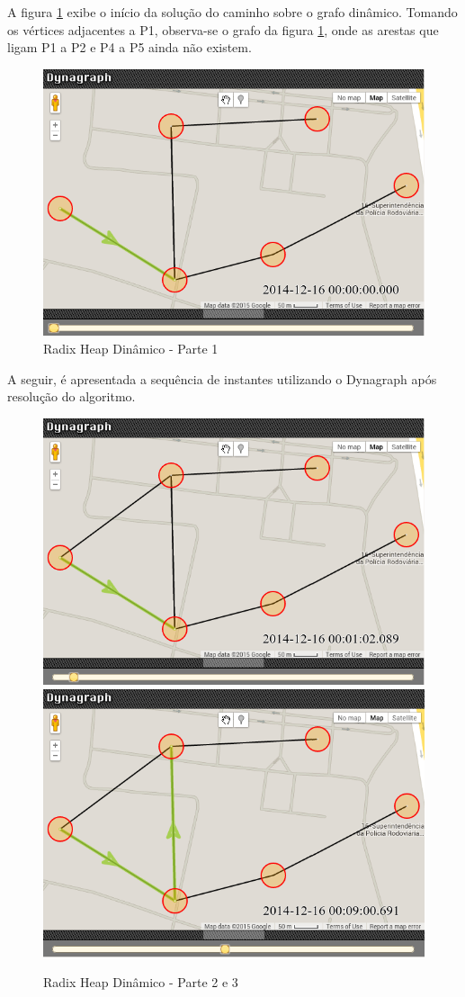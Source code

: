 A figura \ref{fig:dyndyn1} exibe o início da solução do caminho sobre o grafo dinâmico.
Tomando os vértices adjacentes a P1, observa-se o grafo da figura \ref{fig:dyndyn1}, onde as arestas
que ligam P1 a P2 e P4 a P5 ainda não existem.

\begin{figure}[htbp]
\centering
 \includegraphics[width=.55\textwidth]{chapters/fig/dyndyn1.png}
\caption{Radix Heap Dinâmico - Parte 1}
\label{fig:dyndyn1}
\end{figure}
\FloatBarrier

A seguir, é apresentada a sequência de instantes utilizando o Dynagraph após resolução do algoritmo.

\begin{figure}[htbp]
\centering
 \includegraphics[width=.45\textwidth]{chapters/fig/dyndyn2.png}
 \includegraphics[width=.45\textwidth]{chapters/fig/dyndyn3.png}
\caption{Radix Heap Dinâmico - Parte 2 e 3}
\label{fig:dyndyn2}
\end{figure}

